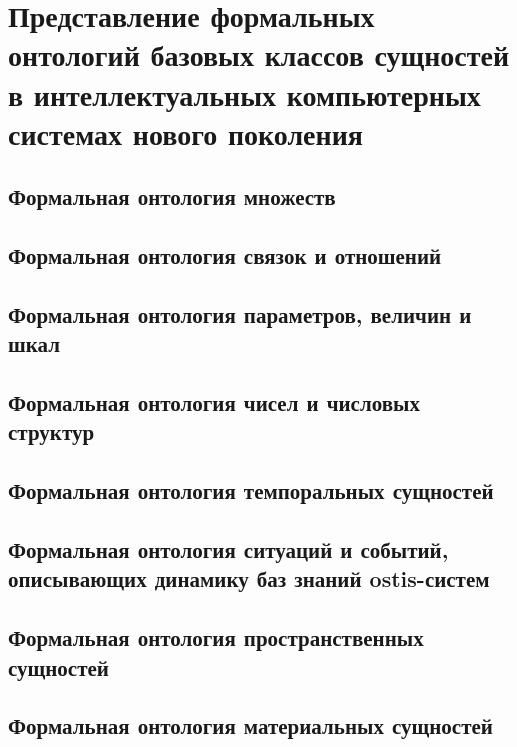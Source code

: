 \chapter{Представление формальных онтологий базовых классов сущностей в интеллектуальных компьютерных системах нового поколения}
\label{chapter_top_ontologies}


\section{Формальная онтология множеств}
\section{Формальная онтология связок и отношений}
\section{Формальная онтология параметров, величин и шкал}
\section{Формальная онтология чисел и числовых структур}
\section{Формальная онтология темпоральных сущностей}
\section{Формальная онтология ситуаций и событий, описывающих динамику баз знаний ostis-систем}
\section{Формальная онтология пространственных сущностей}
\section{Формальная онтология материальных сущностей}

%